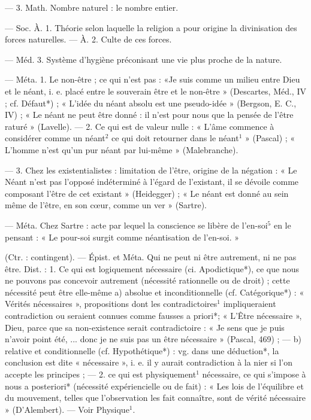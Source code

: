 \begin{itemize}[leftmargin=1cm, label=, itemsep=1pt]
— 3. Math. Nombre naturel : le
nombre entier.

 — Soc. À. 1. Théorie selon
laquelle la religion a pour origine
la divinisation des forces naturelles.
— À. 2. Culte de ces forces.

— Méd. 3. Système d'hygiène
préconisant une vie plus proche
de la nature.

 — Méta. 1. Le non-être ; ce qui
n'est pas : «Je suis comme un milieu
entre Dieu et le néant, i. e. placé
entre le souverain être et le non-être » (Descartes, Méd., IV ; cf.
Défaut*) ; « L'idée du néant absolu
est une pseudo-idée » (Bergson,
E. C., IV) ; « Le néant ne peut être
donné : il n’est pour nous que la
pensée de l'être raturé » (Lavelle). —
2. Ce qui est de valeur nulle : « L'âme
commence à considérer comme un
néant$^2$ ce qui doit retourner dans le
néant$^1$ » (Pascal) ; « L'homme n’est
qu'un pur néant par lui-même »
(Malebranche).

— 3. Chez les existentialistes :
limitation de l'être, origine de la
négation : « Le Néant n'est pas
l'opposé indéterminé à l'égard de
l'existant, il se dévoile comme composant l'être de cet existant »
(Heidegger) ; « Le néant est donné
au sein même de l'être, en son cœur,
comme un ver » (Sartre).

 — Méta. Chez Sartre :
acte par lequel la conscience se libère
de l’en-soi$^5$ en le pensant : « Le pour-soi surgit comme néantisation de
l'en-soi. »

 (Ctr. : contingent). — Épist.
et Méta. Qui ne peut ni être autrement, ni ne pas être. Dist. : 1. Ce
qui est logiquement nécessaire (ci.
Apodictique*), ce que nous ne pouvons pas concevoir autrement (nécessité rationnelle ou de droit) ; cette
nécessité peut être elle-même
a) absolue et inconditionnelle (cf.
Catégorique*) : « Vérités nécessaires »,
propositions dont les contradictoires$^1$
impliqueraient contradiction ou seraient connues comme fausses a
priori*; « L'Être nécessaire », Dieu,
parce que sa non-existence serait
contradictoire : « Je sens que je
puis n’avoir point été, ... donc je ne
suis pas un être nécessaire » (Pascal,
469) ; — b) relative et conditionnelle
(cf. Hypothétique*) : vg. dans une
déduction*, la conclusion est dite
« nécessaire », i. e. il y aurait contradiction à la nier si l’on accepte les
principes ; — 2. ce qui est physiquement$^1$ nécessaire, ce qui s'impose à
nous a posteriori* (nécessité expériencielle ou de fait) : « Les lois de
l'équilibre et du mouvement, telles
que l'observation les fait connaître,
sont de vérité nécessaire » (D’Alembert). — Voir Physique$^1$.


\end{itemize}
